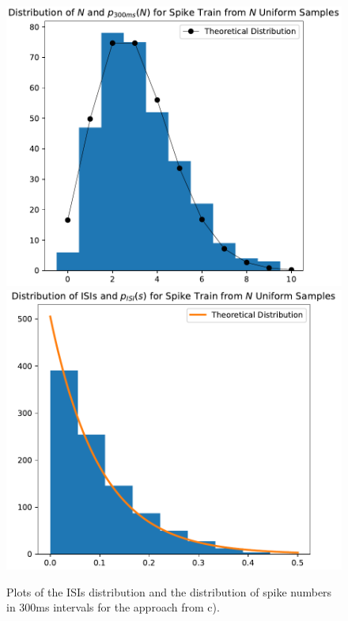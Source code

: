 \documentclass{scrartcl}
\begin{document}
    \begin{figure}[h]
        \label{uni}
        \includegraphics[width=0.5\linewidth]{spikes_dist_uni.pdf}
        \includegraphics[width=0.5\linewidth]{isi_dist_uni.pdf}
        \caption{Plots of the ISIs distribution and the distribution of spike numbers in 300ms intervals for the approach from c).}
    \end{figure}
    \pagebreak
\end{document}
